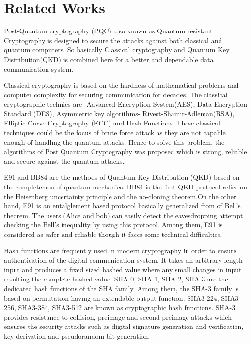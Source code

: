\documentclass{article}
\begin{document}
\section{Related Works}
\label{sec:relatedWorks}
Post-Quantum cryptography (PQC) also known as Quantum resistant Cryptography is designed to secure the attacks against both classical and quantum computers. So basically Classical cryptography and Quantum Key Distribution(QKD) is combined here for a better and dependable data communication system.

Classical cryptography is based on the hardness of mathematical problems and computer complexity for securing communication for decades. The classical cryptographic technics are- Advanced Encryption System(AES), Data Encryption Standard (DES), Asymmetric key algorithms- Rivest-Shamir-Adleman(RSA), Elliptic Curve Cryptography (ECC) and Hash Functions. These classical techniques could be the focus of brute force attack as they are not capable enough of handling the quantum attacks. Hence to solve this problem, the algorithms of Post Quantum Cryptography was proposed which is strong, reliable and secure against the quantum attacks.\cite{sharma2023post}

E91 and BB84 are the methods of Quantum Key Distribution (QKD) based on the completeness of quantum mechanics. BB84 is the first QKD protocol relies on the Heisenberg uncertainty principle and the no-cloning theorem.On the other hand,  E91 is an entalglement based protocol basically generalized from of Bell’s theorem. The users (Alice and bob) can easily detect the eavesdropping attempt checking the Bell's inequality by using this protocol. \cite{ekert1991quantum} Among them, E91 is considered as safer and reliable though it faces some technical difficulties.\cite{alvarez2016comparison}

Hash functions are frequently used in modern cryptography in order to ensure authentication of the digital communication system. It takes an arbitrary length input and produces a fixed sized hashed value where any small changes in input resulting the complete hashed value. SHA-0, SHA-1, SHA-2, SHA-3 are the dedicated hash functions of the SHA family.\cite{madhuravani2013cryptographic} Among them, the SHA-3 family is based on permutation having an extendable output function. SHA3-224, SHA3-256, SHA3-384, SHA3-512 are known as cryptographic hash functions. SHA-3 provides resistance to collision, preimage and second preimage attacks which ensures the security attacks such as digital signature generation and verification, key derivation and pseudorandom bit generation. \cite{dworkin2015sha}
\end{document}
